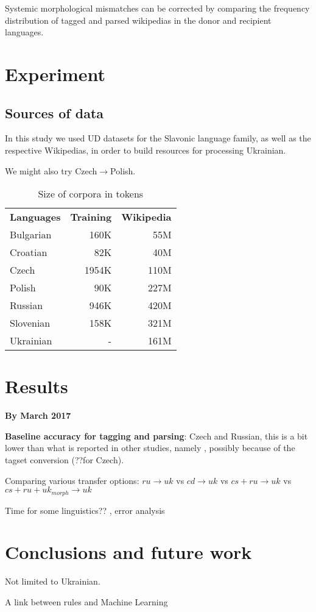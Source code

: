 \documentclass[11pt]{article}
\begin{document}
Systemic morphological mismatches can be corrected by comparing the frequency distribution of tagged and parsed wikipedias in the donor and recipient languages.

\section{Experiment}
\subsection{Sources of data}
In this study we used UD datasets for the Slavonic language family, as well as the respective Wikipedias, in order to build resources for processing Ukrainian.

We might also try Czech$\to$Polish.

\begin{table}
  \caption{Size of corpora in tokens}
  \label{tabCorpora}
  \begin{tabular}{lrr}
    \textbf{Languages} 	& \textbf{Training} &\textbf{Wikipedia}\\
    Bulgarian	&160K	&55M\\
    Croatian	&82K	&40M\\
    Czech	&1954K	&110M\\
    Polish	&90K	&227M\\
    Russian	&946K	&420M\\
    Slovenian	&158K	&321M\\
    Ukrainian	&-	&161M\\
  \end{tabular}
\end{table}



\section{Results}
\textbf{By March 2017}

\textbf{Baseline accuracy for tagging and parsing}: Czech and Russian, this is a bit lower than what is reported in other studies, namely \cite{sharoff11dialog,straka16}, possibly because of the tagset conversion (??for Czech).

Comparing various transfer options: $ru\to uk$ vs  $cd\to uk$ vs $cs+ru\to uk$ vs $cs+ru+uk_{morph}\to uk$

Time for some linguistics?? \cite{manning11}, error analysis

\section{Conclusions and future work}
Not limited to Ukrainian.

A link between rules and Machine Learning



\end{document}
